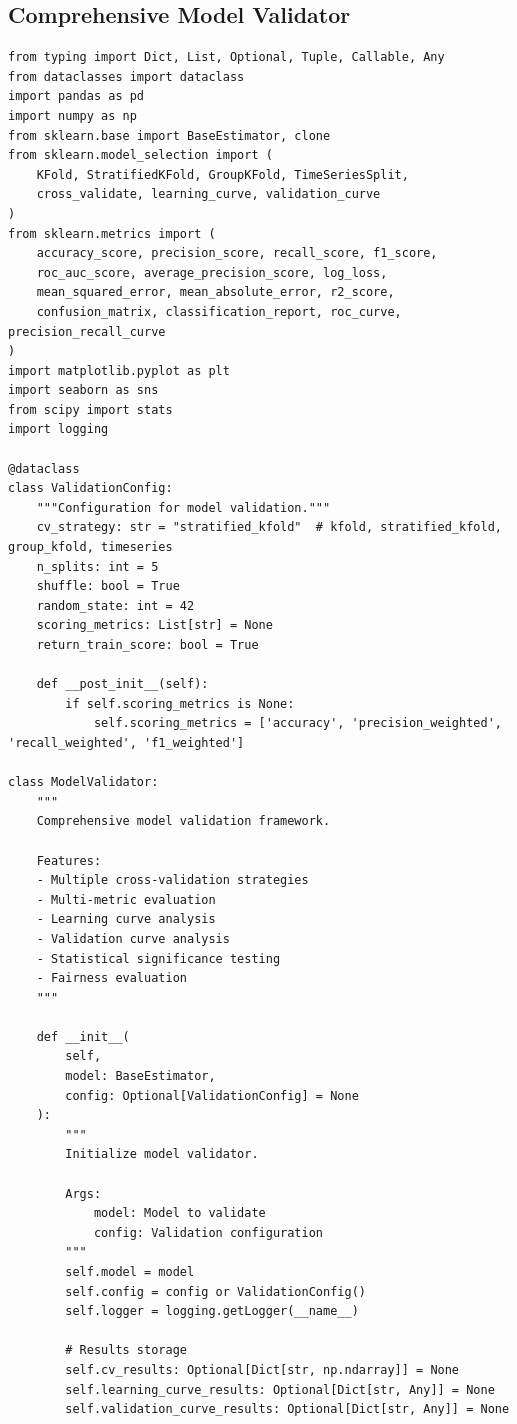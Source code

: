 \subsection{Comprehensive Model Validator}

\begin{lstlisting}[style=python, caption={Production Model Validation Framework}]
from typing import Dict, List, Optional, Tuple, Callable, Any
from dataclasses import dataclass
import pandas as pd
import numpy as np
from sklearn.base import BaseEstimator, clone
from sklearn.model_selection import (
    KFold, StratifiedKFold, GroupKFold, TimeSeriesSplit,
    cross_validate, learning_curve, validation_curve
)
from sklearn.metrics import (
    accuracy_score, precision_score, recall_score, f1_score,
    roc_auc_score, average_precision_score, log_loss,
    mean_squared_error, mean_absolute_error, r2_score,
    confusion_matrix, classification_report, roc_curve, precision_recall_curve
)
import matplotlib.pyplot as plt
import seaborn as sns
from scipy import stats
import logging

@dataclass
class ValidationConfig:
    """Configuration for model validation."""
    cv_strategy: str = "stratified_kfold"  # kfold, stratified_kfold, group_kfold, timeseries
    n_splits: int = 5
    shuffle: bool = True
    random_state: int = 42
    scoring_metrics: List[str] = None
    return_train_score: bool = True

    def __post_init__(self):
        if self.scoring_metrics is None:
            self.scoring_metrics = ['accuracy', 'precision_weighted', 'recall_weighted', 'f1_weighted']

class ModelValidator:
    """
    Comprehensive model validation framework.

    Features:
    - Multiple cross-validation strategies
    - Multi-metric evaluation
    - Learning curve analysis
    - Validation curve analysis
    - Statistical significance testing
    - Fairness evaluation
    """

    def __init__(
        self,
        model: BaseEstimator,
        config: Optional[ValidationConfig] = None
    ):
        """
        Initialize model validator.

        Args:
            model: Model to validate
            config: Validation configuration
        """
        self.model = model
        self.config = config or ValidationConfig()
        self.logger = logging.getLogger(__name__)

        # Results storage
        self.cv_results: Optional[Dict[str, np.ndarray]] = None
        self.learning_curve_results: Optional[Dict[str, Any]] = None
        self.validation_curve_results: Optional[Dict[str, Any]] = None


\end{lstlisting}
